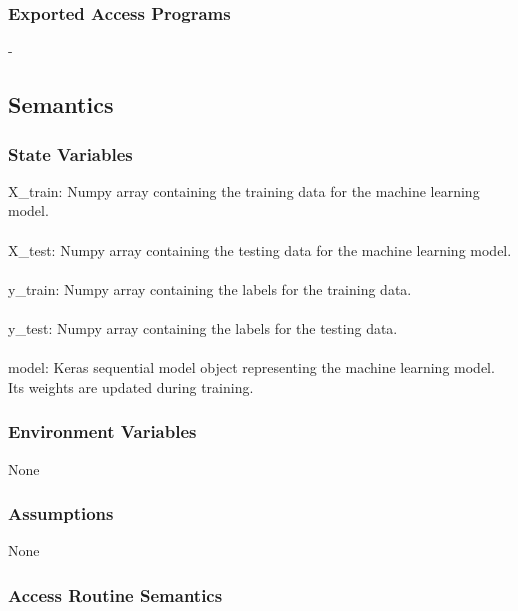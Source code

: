 \documentclass[12pt, titlepage]{article}
\begin{document}
\subsubsection{Exported Access Programs}
-

\subsection{Semantics}

\subsubsection{State Variables}

X\_train: Numpy array containing the training data for the machine learning model.\\
\\
X\_test: Numpy array containing the testing data for the machine learning model.\\
\\
y\_train: Numpy array containing the labels for the training data.\\
\\
y\_test: Numpy array containing the labels for the testing data.\\
\\
model: Keras sequential model object representing the machine learning model. Its weights are updated during training.\\

\subsubsection{Environment Variables}

None\\

\subsubsection{Assumptions}

None\\

\subsubsection{Access Routine Semantics}
\end{document}
